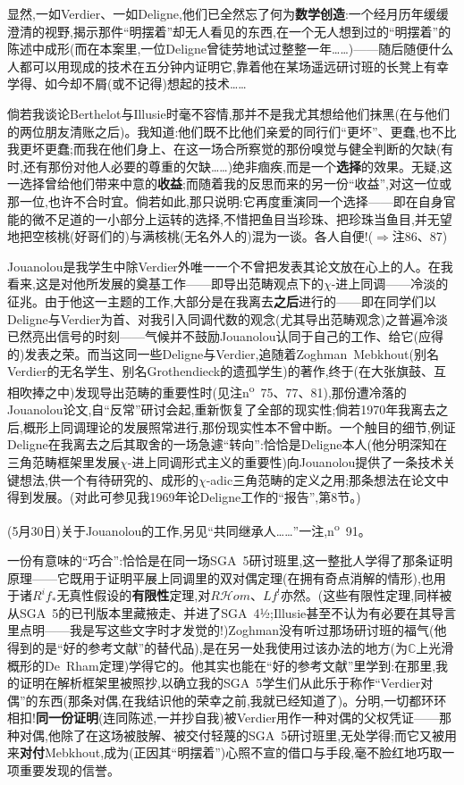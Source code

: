 显然,一如Verdier、一如Deligne,他们已全然忘了何为\textbf{数学创造}:一个经月历年缓缓澄清的视野,揭示那件“明摆着”却无人看见的东西,在一个无人想到过的“明摆着”的陈述中成形(而在本案里,一位Deligne曾徒劳地试过整整一年……)——随后随便什么人都可以用现成的技术在五分钟内证明它,靠着他在某场遥远研讨班的长凳上有幸学得、如今却不屑(或不记得)想起的技术……

倘若我谈论Berthelot与Illusie时毫不容情,那并不是我尤其想给他们抹黑(在与他们的两位朋友清账之后)。我知道:他们既不比他们亲爱的同行们“更坏”、更蠢,也不比我更坏更蠢;而我在他们身上、在这一场合所察觉的那份嗅觉与健全判断的欠缺(有时,还有那份对他人必要的尊重的欠缺……)绝非痼疾,而是一个\textbf{选择}的效果。无疑,这一选择曾给他们带来中意的\textbf{收益}\dmark{};而随着我的反思而来的另一份“收益”,对这一位或那一位,也许不合时宜。倘若如此,那只说明:它再度重演同一个选择——即在自身官能的微不足道的一小部分上运转的选择,不惜把鱼目当珍珠、把珍珠当鱼目,并无望地把空核桃(好哥们的)与满核桃(无名外人的)混为一谈。各人自便!($\Rightarrow$注86、87)


Jouanolou是我学生中除Verdier外唯一一个不曾把发表其论文放在心上的人。在我看来,这是对他所发展的奠基工作——即导出范畴观点下的$\chi$-进上同调——冷淡的征兆。由于他这一主题的工作,大部分是在我离去\textbf{之后}进行的——即在同学们以Deligne与Verdier为首、对我引入同调代数的观念(尤其导出范畴观念)之普遍冷淡已然亮出信号的时刻——气候并不鼓励Jouanolou认同于自己的工作、给它(应得的)发表之荣。而当这同一些Deligne与Verdier,追随着Zoghman~Mebkhout(别名Verdier的无名学生、别名Grothendieck的遗孤学生)的著作,终于(在大张旗鼓、互相吹捧之中)发现导出范畴的重要性时(见注n\textsuperscript{o}~75、77、81),那份遭冷落的Jouanolou论文,自“反常”研讨会起,重新恢复了全部的现实性;倘若1970年我离去之后,概形上同调理论的发展照常进行,那份现实性本不曾中断。一个触目的细节,例证Deligne在我离去之后其取舍的一场急遽“转向”:恰恰是Deligne本人(他分明深知在三角范畴框架里发展$\chi$-进上同调形式主义的重要性)向Jouanolou提供了一条技术关键想法,供一个有待研究的、成形的$\chi$-adic三角范畴的定义之用;那条想法在论文中得到发展。(对此可参见我1969年论Deligne工作的“报告”,第8节。)

(5月30日)关于Jouanolou的工作,另见“共同继承人……”一注,n\textsuperscript{o}~91。


一份有意味的“巧合”:恰恰是在同一场SGA~5研讨班里,这一整批人学得了那条证明原理——它既用于证明平展上同调里的双对偶定理(在拥有奇点消解的情形),也用于诸$R^if_*$无真性假设的\textbf{有限性}\dmark{}定理,对$R\mathcal{H}om$、$Lf^!$亦然。(这些有限性定理,同样被从SGA~5的已刊版本里藏掖走、并进了SGA~4½;Illusie甚至不认为有必要在其导言里点明——我是写这些文字时才发觉的!)Zoghman没有听过那场研讨班的福气(他得到的是“好的参考文献”的替代品),是在另一处我使用过该办法的地方(为$\mathbb{C}$上光滑概形的De~Rham定理)学得它的。他其实也能在“好的参考文献”里学到:在那里,我的证明在解析框架里被照抄,以确立我的SGA~5学生们从此乐于称作“Verdier对偶”的东西(那条对偶,在我结识他的荣幸之前,我就已经知道了)。分明,一切都环环相扣!\textbf{同一份证明}(连同陈述,一并抄自我)被Verdier用作一种对偶的父权凭证——那种对偶,他除了在这场被肢解、被交付轻蔑的SGA~5研讨班里,无处学得;而它又被用来\textbf{对付}Mebkhout,成为(正因其“明摆着”)心照不宣的借口与手段,毫不脸红地巧取一项重要发现的信誉。

